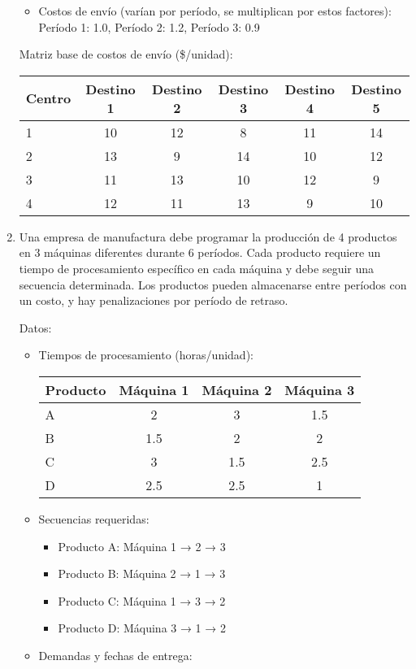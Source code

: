 \documentclass[12pt]{article}
\begin{document}
\begin{enumerate}
\begin{itemize}
\item Costos de envío (varían por período, se multiplican por estos factores): Período 1: 1.0, Período 2: 1.2, Período 3: 0.9
\end{itemize}

Matriz base de costos de envío (\$/unidad):
\begin{center}
\begin{tabular}{lccccc}
\toprule
Centro & Destino 1 & Destino 2 & Destino 3 & Destino 4 & Destino 5 \\
\midrule
1 & 10 & 12 & 8 & 11 & 14 \\
2 & 13 & 9 & 14 & 10 & 12 \\
3 & 11 & 13 & 10 & 12 & 9 \\
4 & 12 & 11 & 13 & 9 & 10 \\
\bottomrule
\end{tabular}
\end{center}

\item Una empresa de manufactura debe programar la producción de 4 productos en 3 máquinas diferentes durante 6 períodos. Cada producto requiere un tiempo de procesamiento específico en cada máquina y debe seguir una secuencia determinada. Los productos pueden almacenarse entre períodos con un costo, y hay penalizaciones por período de retraso.

Datos:
\begin{itemize}
\item Tiempos de procesamiento (horas/unidad):

\begin{center}
\begin{tabular}{lccc}
\toprule
Producto & Máquina 1 & Máquina 2 & Máquina 3 \\
\midrule
A & 2 & 3 & 1.5 \\
B & 1.5 & 2 & 2 \\
C & 3 & 1.5 & 2.5 \\
D & 2.5 & 2.5 & 1 \\
\bottomrule
\end{tabular}
\end{center}

\item Secuencias requeridas:
  \begin{itemize}
  \item Producto A: Máquina 1 → 2 → 3
  \item Producto B: Máquina 2 → 1 → 3
  \item Producto C: Máquina 1 → 3 → 2
  \item Producto D: Máquina 3 → 1 → 2
  \end{itemize}
\item Demandas y fechas de entrega:


\end{itemize}
\end{enumerate}
\end{document}
